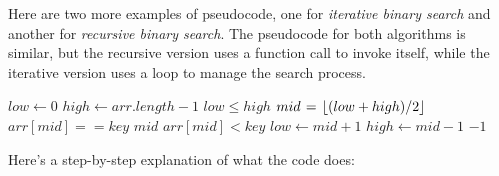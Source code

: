 Here are two more examples of pseudocode, one for \textit{iterative binary search }and another for \textit{recursive binary search}. The pseudocode for both algorithms is similar, but the recursive version uses a function call to invoke itself, while the iterative version uses a loop to manage the search process.

\begin{codebox}
    \li $low \gets 0$ 
    \li $high \gets arr.length -1$ 
    \li \While $low \leq high$ \Do
    \li     $mid \mathrel{\hspace{1pt}=\hspace{1pt}} \left\lfloor (low + high) / 2 \right\rfloor$ 
    \li     \If $arr[mid] == key$ \Then
    \li         \Return $mid$ 
    \li     \ElseIf $arr[mid] < key$ \Then
    \li         $low \gets mid + 1$ 
    \li     \Else
    \li         $high \gets mid - 1$ 
        \End
        \End
    \li \Return $-1$ 
\end{codebox}

Here's a step-by-step explanation of what the code does:

